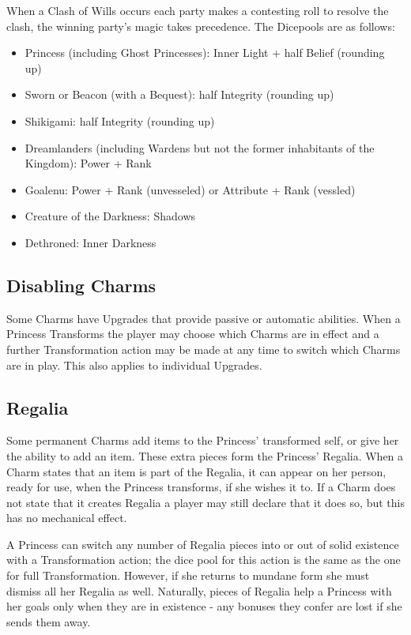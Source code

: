 When a Clash of Wills occurs each party makes a contesting roll to resolve the clash, the winning party's magic takes precedence. The Dicepools are as follows: 
\begin{itemize} \item Princess (including Ghost Princesses): Inner Light + half Belief (rounding up)
\item Sworn or Beacon (with a Bequest): half Integrity (rounding up)
\item Shikigami: half Integrity (rounding up)
\item Dreamlanders (including Wardens but not the former inhabitants of the Kingdom): Power + Rank
\item Goalenu: Power + Rank (unvesseled) or Attribute + Rank (vessled)
\item Creature of the Darkness: Shadows
\item Dethroned: Inner Darkness
\end{itemize}

\subsection*{Disabling Charms}

Some Charms have Upgrades that provide passive or automatic abilities. When a Princess Transforms the player may choose which Charms are in effect and a further Transformation action may be made at any time to switch which Charms are in play. This also applies to individual Upgrades. 

\subsection*{Regalia}

Some permanent Charms add items to the Princess' transformed self, or give her the ability to add an item. These extra pieces form the Princess' Regalia. When a Charm states that an item is part of the Regalia, it can appear on her person, ready for use, when the Princess transforms, if she wishes it to. If a Charm does not state that it creates Regalia a player may still declare that it does so, but this has no mechanical effect. 

A Princess can switch any number of Regalia pieces into or out of solid existence with a Transformation action; the dice pool for this action is the same as the one for full Transformation. However, if she returns to mundane form she must dismiss all her Regalia as well. Naturally, pieces of Regalia help a Princess with her goals only when they are in existence - any bonuses they confer are lost if she sends them away.

